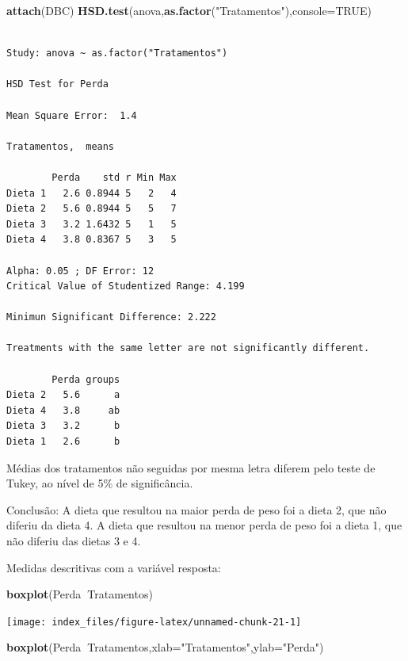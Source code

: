 \documentclass[12pt,brazil,oneside]{book}
\newenvironment{Shaded}{\begin{snugshade}}{\end{snugshade}}
\newcommand{\DataTypeTok}[1]{\textcolor[rgb]{0.13,0.29,0.53}{#1}}
\newcommand{\KeywordTok}[1]{\textcolor[rgb]{0.13,0.29,0.53}{\textbf{#1}}}
\newcommand{\NormalTok}[1]{#1}
\newcommand{\OperatorTok}[1]{\textcolor[rgb]{0.81,0.36,0.00}{\textbf{#1}}}
\newcommand{\OtherTok}[1]{\textcolor[rgb]{0.56,0.35,0.01}{#1}}
\newcommand{\StringTok}[1]{\textcolor[rgb]{0.31,0.60,0.02}{#1}}
\begin{document}
\begin{Shaded}
\begin{Highlighting}[]
\KeywordTok{attach}\NormalTok{(DBC)}
\KeywordTok{HSD.test}\NormalTok{(anova,}\KeywordTok{as.factor}\NormalTok{(}\StringTok{"Tratamentos"}\NormalTok{),}\DataTypeTok{console=}\OtherTok{TRUE}\NormalTok{)}
\end{Highlighting}
\end{Shaded}

\begin{verbatim}

Study: anova ~ as.factor("Tratamentos")

HSD Test for Perda 

Mean Square Error:  1.4 

Tratamentos,  means

        Perda    std r Min Max
Dieta 1   2.6 0.8944 5   2   4
Dieta 2   5.6 0.8944 5   5   7
Dieta 3   3.2 1.6432 5   1   5
Dieta 4   3.8 0.8367 5   3   5

Alpha: 0.05 ; DF Error: 12 
Critical Value of Studentized Range: 4.199 

Minimun Significant Difference: 2.222 

Treatments with the same letter are not significantly different.

        Perda groups
Dieta 2   5.6      a
Dieta 4   3.8     ab
Dieta 3   3.2      b
Dieta 1   2.6      b
\end{verbatim}

Médias dos tratamentos não seguidas por mesma letra diferem pelo teste de Tukey, ao nível de 5\% de significância.

Conclusão: A dieta que resultou na maior perda de peso foi a dieta 2, que não diferiu da dieta 4. A dieta que resultou na menor perda de peso foi a dieta 1, que não diferiu das dietas 3 e 4.

Medidas descritivas com a variável resposta:

\begin{Shaded}
\begin{Highlighting}[]
\KeywordTok{boxplot}\NormalTok{(Perda}\OperatorTok{~}\NormalTok{Tratamentos)}
\end{Highlighting}
\end{Shaded}

\begin{center}\texttt{[image: index\_files/figure-latex/unnamed-chunk-21-1]} \end{center}

\begin{Shaded}
\begin{Highlighting}[]
\KeywordTok{boxplot}\NormalTok{(Perda}\OperatorTok{~}\NormalTok{Tratamentos,}\DataTypeTok{xlab=}\StringTok{"Tratamentos"}\NormalTok{,}\DataTypeTok{ylab=}\StringTok{"Perda"}\NormalTok{)}
\end{Highlighting}
\end{Shaded}
\end{document}
